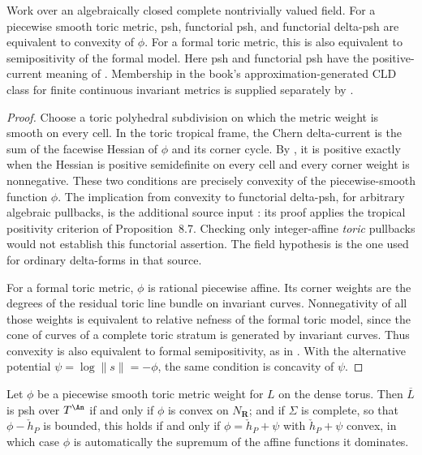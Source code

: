\begin{theorem}\label{thm:toric-positivity}
Work over an algebraically closed complete nontrivially valued field.
For a piecewise smooth toric metric, psh, functorial psh, and functorial
delta-psh are equivalent to convexity of $\phi$.  For a formal toric metric,
this is also equivalent to semipositivity of the formal model.
Here psh and functorial psh have the positive-current meaning of
\cite{GK19}.  Membership in the book's approximation-generated CLD class
for finite continuous invariant metrics is supplied separately by
.
\end{theorem}
\begin{proof}
Choose a toric polyhedral subdivision on which the metric weight is smooth
on every cell.  In the toric tropical frame, the Chern delta-current is the
sum of the facewise Hessian of $\phi$ and its corner cycle.  By
, it is positive exactly when the
Hessian is positive semidefinite on every cell and every corner weight is
nonnegative.  These two conditions are precisely convexity of the
piecewise-smooth function $\phi$.  The implication from convexity to
functorial delta-psh, for arbitrary algebraic pullbacks, is the additional
source input \cite[Proposition~8.13]{GK19}: its proof applies the tropical
positivity criterion of Proposition~8.7.  Checking only integer-affine
\emph{toric} pullbacks would not establish this functorial assertion.
The field hypothesis is the one used for ordinary delta-forms in that source.

For a formal toric metric, $\phi$ is rational piecewise affine.  Its corner
weights are the degrees of the residual toric line bundle on invariant
curves.  Nonnegativity of all those weights is equivalent to relative
nefness of the formal toric model, since the cone of curves of a complete
toric stratum is generated by invariant curves.  Thus convexity is also
equivalent to formal semipositivity, as in
\cite[Corollary~8.14]{GK19}.  With the alternative potential
$\psi=\log\|s\|=-\phi$, the same condition is concavity of $\psi$.
\end{proof}

\begin{corollary}
\label{cor:ch19-toric-convexity-test}
Let $\phi$ be a piecewise smooth toric metric weight for $L$ on the
dense torus.  Then $\overline L$ is psh over $T^{\An}$ if and only if
$\phi$ is convex on $N_{\mathbf R}$; and if $\Sigma$ is complete, so
that $\phi-\check h_P$ is bounded, this holds if and only if
$\phi=\check h_P+\psi$ with $\check h_P+\psi$ convex, in which case
$\phi$ is automatically the supremum of the affine functions it dominates.
\end{corollary}

